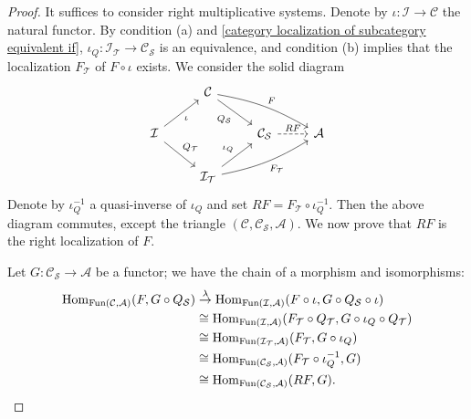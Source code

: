 \begin{proof}
It suffices to consider right multiplicative systems. Denote by $\iota:\mathcal{I}\to\mathcal{C}$ the natural functor. By condition (a) and \cref{category localization of subcategory equivalent if}, $\iota_Q:\mathcal{I}_\mathcal{T}\to\mathcal{C}_\mathcal{S}$ is an equivalence, and condition (b) implies that the localization $F_\mathcal{T}$ of $F\circ\iota$ exists. We consider the solid diagram
\[\begin{tikzcd}
&\mathcal{C}\ar[rd,swap,"Q_\mathcal{S}"]\ar[rrd,bend left=10pt,"F"]&&\\
\mathcal{I}\ar[ru,swap,"\iota"]\ar[rd,"Q_\mathcal{T}"]&&\mathcal{C}_\mathcal{S}\ar[r,dashed,"RF"]&\mathcal{A}\\
&\mathcal{I}_\mathcal{T}\ar[ru,"\iota_Q"]\ar[rru,swap,bend right=10pt,"F_\mathcal{T}"]
\end{tikzcd}\]
Denote by $\iota_Q^{-1}$ a quasi-inverse of $\iota_Q$ and set $RF=F_\mathcal{T}\circ\iota_Q^{-1}$. Then the above diagram commutes, except the triangle $(\mathcal{C},\mathcal{C}_\mathcal{S},\mathcal{A})$. We now prove that $RF$ is the right localization of $F$.\par
Let $G:\mathcal{C}_\mathcal{S}\to\mathcal{A}$ be a functor; we have the chain of a morphism and isomorphisms:
\begin{equation}\label{category localization of functor exist if-3}
\begin{aligned}
\mathrm{Hom}_{\mathrm{Fun}(\mathcal{C},\mathcal{A})}(F,G\circ Q_\mathcal{S})& \stackrel{\lambda}{\to} \mathrm{Hom}_{\mathrm{Fun}(\mathcal{I},\mathcal{A})}(F\circ\iota,G\circ Q_\mathcal{S}\circ\iota)\\
&\cong\mathrm{Hom}_{\mathrm{Fun}(\mathcal{I},\mathcal{A})}(F_\mathcal{T}\circ Q_\mathcal{T},G\circ\iota_Q\circ Q_\mathcal{T})\\
&\cong\mathrm{Hom}_{\mathrm{Fun}(\mathcal{I}_\mathcal{T},\mathcal{A})}(F_\mathcal{T},G\circ\iota_Q)\\
&\cong\mathrm{Hom}_{\mathrm{Fun}(\mathcal{C}_\mathcal{S},\mathcal{A})}(F_\mathcal{T}\circ\iota_Q^{-1},G)\\
&\cong\mathrm{Hom}_{\mathrm{Fun}(\mathcal{C}_\mathcal{S},\mathcal{A})}(RF,G).
\end{aligned}
\end{equation}

\end{proof}
